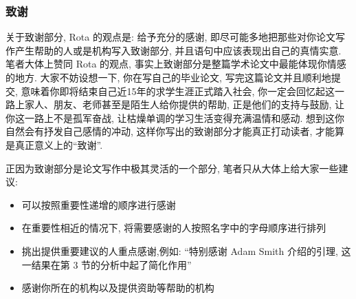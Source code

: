 \documentclass{formatBook}
\begin{document}
\subsubsection{致谢}
关于致谢部分, Rota 的观点是: 给予充分的感谢, 即尽可能多地把那些对你论文写作产生帮助的人或是机构写入致谢部分, 并且语句中应该表现出自己的真情实意\cite{RotaTen1997}. 笔者大体上赞同 Rota 的观点, 事实上致谢部分是整篇学术论文中最能体现你情感的地方. 大家不妨设想一下, 你在写自己的毕业论文, 写完这篇论文并且顺利地提交, 意味着你即将结束自己近15年的求学生涯正式踏入社会, 你一定会回忆起这一路上家人、朋友、老师甚至是陌生人给你提供的帮助, 正是他们的支持与鼓励, 让你这一路上不是孤军奋战, 让枯燥单调的学习生活变得充满温情和感动. 想到这你自然会有抒发自己感情的冲动, 这样你写出的致谢部分才能真正打动读者, 才能算是真正意义上的“致谢”. 
\par 正因为致谢部分是论文写作中极其灵活的一个部分, 笔者只从大体上给大家一些建议: 
\begin{itemize}
    \item 可以按照重要性递增的顺序进行感谢
    \item 在重要性相近的情况下, 将需要感谢的人按照名字中的字母顺序进行排列
    \item 挑出提供重要建议的人重点感谢,例如: “特别感谢 Adam Smith 介绍的引理, 这一结果在第 3 节的分析中起了简化作用”
    \item 感谢你所在的机构以及提供资助等帮助的机构
\end{itemize}
\end{document}
